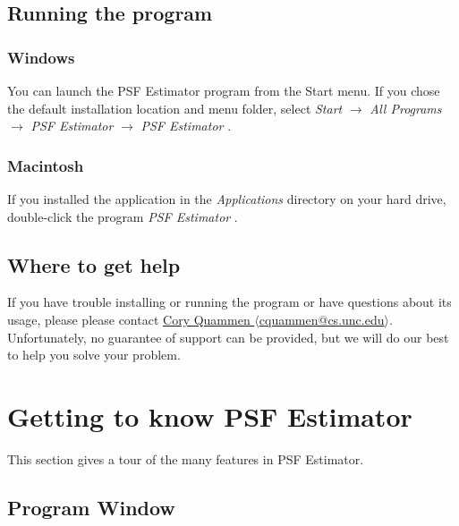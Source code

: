\documentclass[11pt,titlepage,twoside]{article}
\begin{document}
\subsection{Running the program}

\subsubsection{Windows}

You can launch the PSF Estimator program from the Start menu. If you chose the default installation location and menu folder, select \emph{Start} $\rightarrow$ \emph{All Programs} $\rightarrow$ \emph{PSF Estimator \ProgramVersionNoSpace} $\rightarrow$ \emph{PSF Estimator \ProgramVersionNoSpace}.

\subsubsection{Macintosh}

If you installed the application in the \emph{Applications} directory on your hard drive, double-click the program \emph{PSF Estimator \ProgramVersionNoSpace}.

\subsection{Where to get help}

If you have trouble installing or running the program or have questions about its usage, please please contact  \href{mailto:cquammen@cs.unc.edu}{Cory Quammen $\langle$cquammen@cs.unc.edu$\rangle$}. Unfortunately, no guarantee of support can be provided, but we will do our best to help you solve your problem.

\section{Getting to know PSF Estimator}

This section gives a tour of the many features in PSF Estimator.

\subsection{Program Window}
\end{document}
